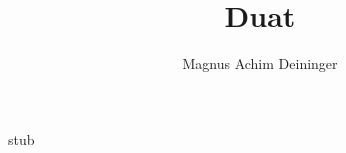 \documentclass[a4paper,twoside,titlepage]{article}
\title{Duat}
\author{Magnus Achim Deininger}
\begin{document}
stub
\end{document}
